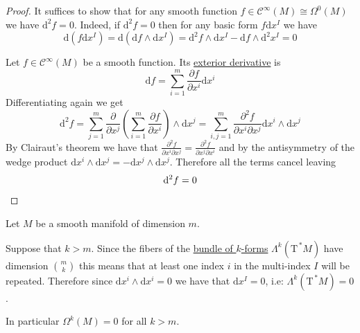 \documentclass[../../main]{subfiles}
\begin{document}
\begin{proof}
  It suffices to show that for any smooth function \(f \in \mathcal{C}^{\infty}(M) \cong \Omega^{0}(M)\) we have \(\mathrm{d}^{2}f = 0\).
  Indeed, if \(\mathrm{d}^{2}f = 0\) then for any basic form \(f\mathrm{d}x^{I}\) we have
  \begin{equation*}
    \mathrm{d}(f\mathrm{d}x^{I}) = \mathrm{d}(\mathrm{d}f \wedge \mathrm{d}x^{I}) = \mathrm{d}^{2}f \wedge \mathrm{d}x^{I} - \mathrm{d}f \wedge \mathrm{d}^{2}x^{I} = 0
  \end{equation*}

  Let \(f \in \mathcal{C}^{\infty}(M)\) be a smooth function.
  Its \hyperref[def:exterior-derivative-k-form]{exterior derivative} is
  \begin{equation*}
    \mathrm{d}f = \sum_{i = 1}^{m} \frac{\partial f}{\partial x^{i}} \mathrm{d}x^{i}
  \end{equation*}
  Differentiating again we get
  \begin{equation*}
    \mathrm{d}^{2}f = \sum_{j=1}^{m} \frac{\partial}{\partial x^{j}} \left( \sum_{i=1}^{m}  \frac{\partial f}{\partial x^{i}} \right) \wedge \mathrm{d}x^{j} = \sum_{i,j=1}^{m} \frac{\partial^{2} f}{\partial x^{i} \partial x^{j}} \mathrm{d}x^{i} \wedge \mathrm{d}x^{j}
  \end{equation*}
  By Clairaut's theorem we have that \( \frac{\partial^{2} f}{\partial x^{i} \partial x^{j}} =  \frac{\partial^{2} f}{\partial x^{j} \partial x^{i}}\) and by the antisymmetry of the wedge product \(\mathrm{d}x^{i} \wedge \mathrm{d}x^{j} = - \mathrm{d}x^{j} \wedge \mathrm{d}x^{j}\).
  Therefore all the terms cancel leaving
  \begin{equation*}
    \mathrm{d}^{2} f = 0 \qedhere
  \end{equation*}
\end{proof}

\begin{example}\label{ex:finiteness-de-Rham}
  Let \(M\) be a smooth manifold of dimension \(m\).

  Suppose that \(k > m\).
  Since the fibers of the \hyperref[def:smooth-k-form-bundle]{bundle of \(k\)-forms} \(\Lambda^{k}(\mathrm{T}^{\,\ast}M)\) have dimension \(\binom{m}{k}\) this means that at least one index \(i\) in the multi-index \(I\) will be repeated.
  Therefore since \(\mathrm{d}x^{i} \wedge \mathrm{d}x^{i} = 0\) we have that \(\mathrm{d}x^{I} = 0\), i.e: \(\Lambda^{k}(\mathrm{T}^{\,\ast}M) = 0\).

  In particular \(\Omega^{k}(M) = 0\) for all \(k > m\).
\end{example}
\end{document}
